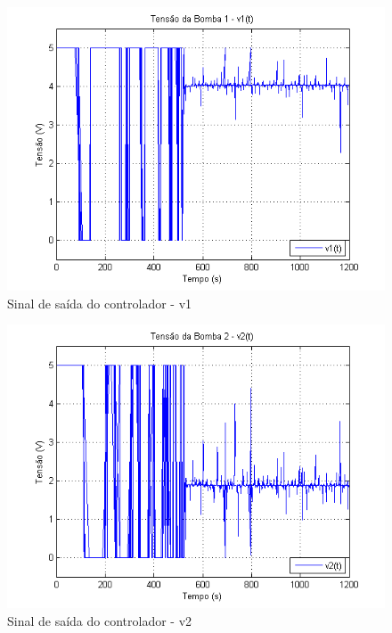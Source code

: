 \begin{figure}[H]
	\centering
	\includegraphics[height=0.35\paperheight ,keepaspectratio]{img/fm_u1_ulim.png}
	\caption{\small Sinal de saída do controlador - v1 }
	\label{figFm_u1_ulim}
\end{figure}

\begin{figure}[H]
	\centering
	\includegraphics[height=0.35\paperheight ,keepaspectratio]{img/fm_u2_ulim.png}
	\caption{Sinal de saída do controlador - v2 }
	\label{figFm_u2_ulim}
\end{figure}

